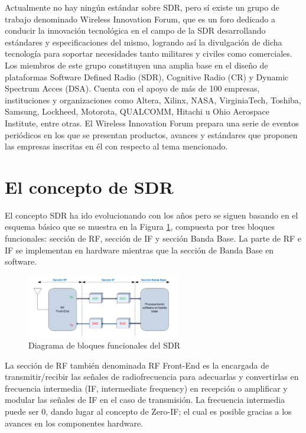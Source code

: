 Actualmente no hay ningún estándar sobre SDR, pero sí existe un grupo de trabajo
denominado Wireless Innovation Forum, que es un foro dedicado a conducir la innovación
tecnológica en el campo de la SDR desarrollando estándares y especificaciones del mismo,
logrando así la divulgación de dicha tecnología para soportar necesidades tanto militares y
civiles como comerciales. Los miembros de este grupo constituyen una amplia base en el diseño de plataformas Software Defined Radio (SDR), Cognitive Radio (CR) y Dynamic Spectrum
Acces (DSA). Cuenta con el apoyo de más de 100 empresas, instituciones y organizaciones
como Altera, Xilinx, NASA, VirginiaTech, Toshiba, Samsung, Lockheed, Motorota,
QUALCOMM, Hitachi u Ohio Aerospace Institute, entre otras. El Wireless Innovation Forum
prepara una serie de eventos periódicos en los que se presentan productos, avances y estándares que proponen las empresas inscritas en él con respecto al tema mencionado.

\section{El concepto de SDR}

El concepto SDR ha ido evolucionando con los años pero se siguen basando en el esquema
básico que se muestra en la Figura \ref{cap1:001}, compuesta por tres bloques funcionales: sección de RF, sección de IF y sección Banda Base. La parte de RF e IF se implementan en hardware mientras que la sección de Banda Base en software.

\begin{figure}[htb]
\centering
\includegraphics[width=0.6\textwidth]{capitulo1/bloquesSDR.png}
\caption{Diagrama de bloques funcionales del SDR}
\label{cap1:001}
\end{figure}

La sección de RF también denominada RF Front-End es la encargada de transmitir/recibir las
señales de radiofrecuencia para adecuarlas y convertirlas en frecuencia intermedia (IF, intermediate frequency) en recepción o amplificar y modular las señales de IF en el caso de transmisión. La frecuencia intermedia puede ser 0, dando lugar al concepto de Zero-IF; el cual es posible gracias a los avances en los componentes hardware.

